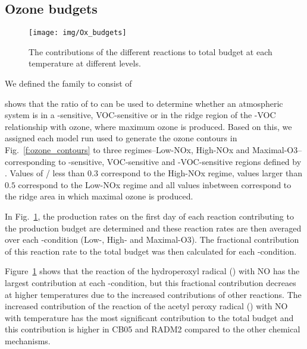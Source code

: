 \subsection{Ozone budgets} \label{ss:r_budgets}

\begin{figure}%
    \centering%
    \caption{The contributions of the different reactions to total  budget at each temperature at different  levels.}%
    \label{f:ozone_budgets}%
    \texttt{[image: img/Ox\_budgets]}
\end{figure}

We defined the  family to consist of 

\citet{Sillman:1995} shows that the ratio of  to  can be used to determine whether an atmospheric system is in a -sensitive, VOC-sensitive or in the ridge region of the -VOC relationship with ozone, where maximum ozone is produced.
Based on this, we assigned each model run used to generate the ozone contours in Fig.~\ref{f:ozone_contours} to three  regimes--Low-NOx, High-NOx and Maximal-O3--corresponding to -sensitive, VOC-sensitive and -VOC-sensitive regions defined by \citet{Sillman:1995}.
Values of / less than $0.3$ correspond to the High-NOx regime, values larger than $0.5$ correspond to the Low-NOx regime and all values inbetween correspond to the ridge area in which maximal ozone is produced.

In Fig.~\ref{f:ozone_budgets}, the production rates on the first day of each reaction contributing to the  production budget are determined and these reaction rates are then averaged over each -condition (Low-, High- and Maximal-O3).
The fractional contribution of this reaction rate to the total  budget was then calculated for each -condition.

Figure~\ref{f:ozone_budgets} shows that the reaction of the hydroperoxyl radical () with NO has the largest contribution at each -condition, but this fractional contribution decreaes at higher temperatures due to the increased contributions of other reactions.
The increased contribution of the reaction of the acetyl peroxy radical () with NO with temperature has the most significant contribution to the total  budget and this contribution is higher in CB05 and RADM2 compared to the other chemical mechanisms.

